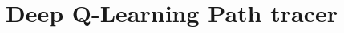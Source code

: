 \documentclass[ %
                    author={Callum Pearce},
                supervisor={Dr. Neill Campbell},
                    degree={MEng},
                     title={How effective are Temporal difference learning methods for reducing the number of zero contribution light paths while still accurately approximating Global Illumination in Path tracing?},
                  subtitle={},
                      type={research},
                      year={2019} ]{dissertation}
\begin{document}

\chapter{Deep Q-Learning Path tracer}
\label{chap:deep-q}

\begin{comment}
{\bf A topic-specific chapter, of roughly $15$ pages} 
\vspace{1cm} 

\noindent
This chapter is intended to describe what you did: the goal is to explain
the main activity or activities, of any type, which constituted your work 
during the project.  The content is highly topic-specific, but for many 
projects it will make sense to split the chapter into two sections: one 
will discuss the design of something (e.g., some hardware or software, or 
an algorithm, or experiment), including any rationale or decisions made, 
and the other will discuss how this design was realised via some form of 
implementation.  

This is, of course, far from ideal for {\em many} project topics.  Some
situations which clearly require a different approach include:

\begin{itemize}
\item In a project where asymptotic analysis of some algorithm is the goal,
      there is no real ``design and implementation'' in a traditional sense
      even though the activity of analysis is clearly within the remit of
      this chapter.
\item In a project where analysis of some results is as major, or a more
      major goal than the implementation that produced them, it might be
      sensible to merge this chapter with the next one: the main activity 
      is such that discussion of the results cannot be viewed separately.
\end{itemize}

\noindent
Note that it is common to include evidence of ``best practice'' project 
management (e.g., use of version control, choice of programming language 
and so on).  Rather than simply a rote list, make sure any such content 
is useful and/or informative in some way: for example, if there was a 
decision to be made then explain the trade-offs and implications 
involved.

\section{Example Section}


\end{comment}
\end{document}
